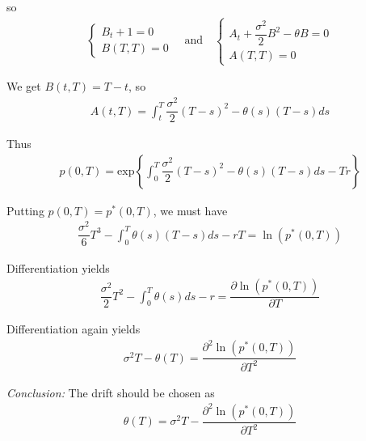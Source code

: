 \noindent so
\begin{equation*}
  \begin{gathered}
    \begin{cases}
      B_t+1=0\\B(T,T)=0
      \end{cases}\quad\text{and}\quad\begin{cases}
      A_t+\dfrac{\sigma^2}{2}B^2-\theta B=0\\A(T,T)=0
    \end{cases}
  \end{gathered}
\end{equation*}\par
\noindent We get $B(t,T) = T-t$, so
\begin{equation*}
  \begin{gathered}
    A(t,T) = \int_{t}^{T}\dfrac{\sigma^2}{2}(T-s)^2-\theta(s)(T-s)ds
  \end{gathered}
\end{equation*}\par
\noindent Thus
\begin{equation*}
  \begin{gathered}
    p(0,T) = \text{exp}\left\{\int_{0}^{T}\dfrac{\sigma^2}{2}(T-s)^2-\theta(s)(T-s)ds-Tr\right\}
  \end{gathered}
\end{equation*}\par
\noindent Putting $p(0,T) = p^*(0,T)$, we must have
\begin{equation*}
  \begin{gathered}
    \dfrac{\sigma^2}{6}T^3-\int_{0}^{T}\theta(s)(T-s)ds-rT=\ln{\left(p^*(0,T)\right)}
  \end{gathered}
\end{equation*}\par
\noindent Differentiation yields
\begin{equation*}
  \begin{gathered}
    \dfrac{\sigma^2}{2}T^2-\int_{0}^{T}\theta(s)ds-r=\dfrac{\partial \ln{\left(p^*(0,T)\right)}}{\partial T}
  \end{gathered}
\end{equation*}\par
\noindent Differentiation again yields
\begin{equation*}
  \begin{gathered}
    \sigma^2T-\theta(T)=\dfrac{\partial^2\ln{\left(p^*(0,T)\right)}}{\partial T^2}
  \end{gathered}
\end{equation*}
\par\bigskip
\noindent\textit{Conclusion:} The drift should be chosen as
\begin{equation*}
  \begin{gathered}
    \theta(T) = \sigma^2T-\dfrac{\partial^2\ln{\left(p^*(0,T)\right)}}{\partial T^2}
  \end{gathered}
\end{equation*}
